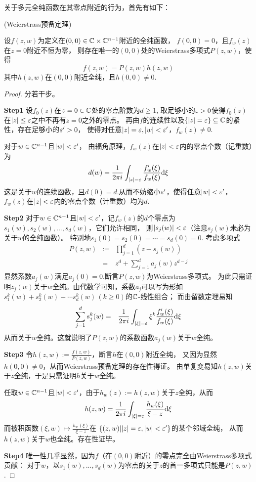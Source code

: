 关于多元全纯函数在其零点附近的行为，首先有如下：

\begin{thm}(Weierstrass预备定理)

设$f(z,w)$为定义在$(0,0)\in\mathbb{C}\times\mathbb{C}^{n-1}$附近的全纯函数，
$f(0,0)=0$，且$f_w(z)$在$z=0$附近不恒为零，
则存在唯一的$(0,0)$处的Weierstrass多项式$P(z,w)$，使得
$$f(z,w)=P(z,w)h(z,w)$$
其中$h(z,w)$在$(0,0)$附近全纯，且$h(0,0)\neq 0$.
\end{thm}

\begin{proof}分若干步。

\textbf{Step1}
设$f_0(z)$在$z=0\in\mathbb{C}$处的零点阶数为$d\geq 1$,
取足够小的$\varepsilon>0$使得$f_0(z)$在$|z|\leq\varepsilon$之中不再有$z=0$之外的零点。
再由$f$的连续性以及$\{|z|=\varepsilon\}\subseteq\mathbb{C}$的紧性，存在足够小的$\varepsilon'>0$，
使得对任意$|z|=\varepsilon,|w|<\varepsilon'$，$f_w(z)\neq 0$.

对于$w\in\mathbb{C}^{n-1}$且$|w|<\varepsilon'$，
由辐角原理，$f_w(z)$在$|z|<\varepsilon$内的零点个数（记重数）为
$$
  d(w)=
       \frac{1}{2\pi i}
       \int_{|z|=\varepsilon}
         \frac{f_w'(\xi)}{f_w(\xi)}
         \mathrm{d}\xi
$$
这是关于$w$的连续函数，且$d(0)=d$.从而不妨缩小$\varepsilon'$，使得任意$|w|<\varepsilon'$，
$f_w(z)$在$|z|<\varepsilon$内的零点个数（计重数）均为$d$.

\textbf{Step2}
对于$w\in\mathbb{C}^{n-1}$且$|w|<\varepsilon'$，记$f_w(z)$的$d$个零点为
$s_1(w),s_2(w),...,s_d(w)$，它们允许相同，
则$|s_j(w)|<\varepsilon$（注意$s_j(w)$未必为关于$w$的全纯函数）。
特别地$s_1(0)=s_2(0)=\cdots=s_d(0)=0$.
考虑多项式
\begin{eqnarray*}
  P(z,w)&:=&\prod_{j=1}^d(z-s_j(w))\\
         &=&z^d+\sum_{j=1}^da_j(w)z^{d-j}
\end{eqnarray*}
显然系数$a_j(w)$满足$a_j(0)=0$.断言$P(z,w)$为Weierstrass多项式。
为此只需证明$z_j(w)$关于$w$全纯。由代数学可知，系数$a_j$可以写为形如
$s_1^k(w)+s_2^k(w)+\cdots s_d^k(w)\,(k\geq 0)$的$\mathbb{C}$-线性组合；
而由留数定理易知
\begin{eqnarray*}
     \sum_{j=1}^ds_j^k(w)
&=&
     \frac{1}{2\pi i}
       \int_{|\xi|=\varepsilon}
         \xi^k
         \frac{f_w'(\xi)}{f_w(\xi)}
         \mathrm{d}\xi
\end{eqnarray*}
从而关于$w$全纯。这就说明了$P(z,w)$的系数函数$a_j(w)$关于$w$全纯。

\textbf{Step3}
令$h(z,w):=\frac{f(z,w)}{P(z,w)}$，断言$h$在$(0,0)$附近全纯，
又因为显然$h(0,0)\neq 0$，从而Weierstrass预备定理的存在性得证。
由单复变易知$h(z,w)$关于$z$全纯，于是只需证明$h$关于$w$全纯。

任取$w\in\mathbb{C}^{n-1}$且$|w|<\varepsilon'$，由于$h_w(z):=h(z,w)$关于$z$全纯，从而
$$
  h(z,w)
=
  \frac{1}{2\pi i}
  \int_{|\xi|=\varepsilon}
    \frac{h_w(\xi)}{\xi-z}
    \mathrm{d}\xi
$$
而被积函数$(\xi,w)\mapsto\frac{h_w(\xi)}{\xi-z}$在
$\{(z,w)||z|=\varepsilon,|w|<\varepsilon'\}$的某个邻域全纯，
从而$h(z,w)$关于$w$也全纯。存在性证毕。

\textbf{Step4}
唯一性几乎显然，因为$f$（在$(0,0)$附近）的零点完全由Weierstrass多项式贡献：
对于$w$，以$s_1(w),...,s_d(w)$为零点的关于$z$的首一多项式只能是$P(z,w)$.
\end{proof}








